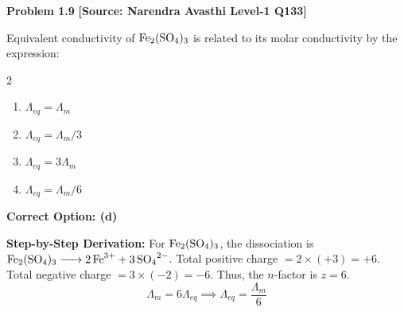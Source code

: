 \begin{problembox}
\textbf{Problem 1.9} \hfill \textbf{[Source: Narendra Avasthi Level-1 Q133]}

Equivalent conductivity of $\ce{Fe2(SO4)3}$ is related to its molar conductivity by the expression:
\begin{multicols}{2}
\begin{enumerate}[label=(\alph*)]
    \item $\Lambda_{eq} = \Lambda_m$
    \item $\Lambda_{eq} = \Lambda_m / 3$
    \item $\Lambda_{eq} = 3 \Lambda_m$
    \item $\Lambda_{eq} = \Lambda_m / 6$
\end{enumerate}
\end{multicols}
\end{problembox}
\begin{solution}
\textbf{Correct Option: (d)}

\textbf{Step-by-Step Derivation:}
For $\ce{Fe2(SO4)3}$, the dissociation is $\ce{Fe2(SO4)3 -> 2Fe^3+ + 3SO4^2-}$.
Total positive charge $= 2 \times (+3) = +6$.
Total negative charge $= 3 \times (-2) = -6$.
Thus, the $n$-factor is $z = 6$.
\begin{equation*}
    \Lambda_m = 6 \Lambda_{eq} \implies \Lambda_{eq} = \frac{\Lambda_m}{6}
\end{equation*}
\end{solution}

